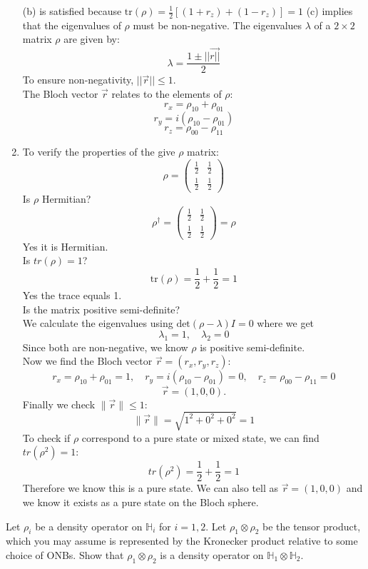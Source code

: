 \documentclass{article}
\renewcommand{\H}{\mathbb{H}}
\begin{document}
\begin{enumerate}
    (b) is satisfied because $\text{tr}(\rho) = \frac{1}{2} \left[ (1 + r_z) + (1 - r_z) \right] = 1$
    (c) implies that the eigenvalues of $\rho$ must be non-negative. The eigenvalues $\lambda$ of a $2\times2$ matrix $\rho$ are given by: $$\lambda=\frac{1\pm||\vec{r||}}{2}$$ To ensure non-negativity, $||\vec{r}|| \leq 1.$\\
    The Bloch vector $\vec{r}$ relates to the elements of $\rho$:
    $$r_x=\rho_{10}+\rho_{01}$$
    $$r_y=i(\rho_{10}-\rho_{01})$$
    $$r_z=\rho_{00}-\rho_{11}$$
    \item[b)] To verify the properties of the give $\rho$ matrix: $$\rho = \begin{pmatrix} \frac{1}{2} & \frac{1}{2} \\ \frac{1}{2} & \frac{1}{2} \end{pmatrix}$$
    Is $\rho$ Hermitian? $$\rho^\dagger = \begin{pmatrix} \frac{1}{2} & \frac{1}{2} \\ \frac{1}{2} & \frac{1}{2} \end{pmatrix} = \rho$$ Yes it is Hermitian.\\ Is $tr(\rho)=1$? $$\text{tr}(\rho) = \frac{1}{2} + \frac{1}{2} = 1$$ Yes the trace equals 1.\\ Is the matrix positive semi-definite?\\ We calculate the eigenvalues using $\text{det}(\rho-\lambda) I=0$ where we get $$\lambda_1 = 1, \quad \lambda_2 = 0$$ Since both are non-negative, we know $\rho$ is positive semi-definite.\\
    Now we find the Bloch vector $\vec{r} = (r_x, r_y, r_z)$: $$r_x = \rho_{10} + \rho_{01} = 1, \quad r_y = i (\rho_{10} - \rho_{01}) = 0, \quad r_z = \rho_{00} - \rho_{11} = 0$$
    $$\vec{r} = (1, 0, 0).$$
    Finally we check \(\|\vec{r}\| \leq 1\): $$\|\vec{r}\| = \sqrt{1^2 + 0^2 + 0^2} = 1$$
    To check if $\rho$ correspond to a pure state or mixed state, we can find $tr(\rho^2)=1$: $$tr(\rho^2)=\frac{1}{2}+\frac{1}{2}=1$$ Therefore we know this is a pure state. We can also tell as $\vec{r}=(1, 0, 0)$ and we know it exists as a pure state on the Bloch sphere.
\end{enumerate}

\begin{question}
    Let $\rho_i$ be a density operator on $\H_i$ for $i=1,2.$ Let $\rho_1 \otimes \rho_2$ be the tensor product, which you may assume is represented by the Kronecker product relative to some choice of ONBs. Show that $\rho_1 \otimes \rho_2$ is a density operator on $\H_1 \otimes \H_2$.
\end{question}
\end{document}
